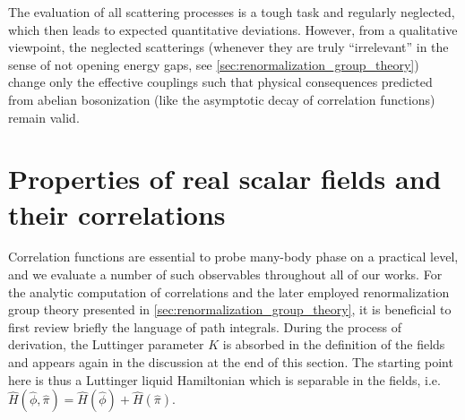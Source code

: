 The evaluation of all scattering processes is a tough task and regularly neglected, which then leads to expected quantitative deviations.
However, from a qualitative viewpoint, the neglected scatterings (whenever they are truly ``irrelevant'' in the sense of not opening energy gaps, see \cref{sec:renormalization_group_theory}) change only the effective couplings such that physical consequences predicted from abelian bosonization (like the asymptotic decay of correlation functions) remain valid.
%
%
\section{Properties of real scalar fields and their correlations}
\label{sec:properties_of_real_scalar_fields_and_their_correlations}
Correlation functions are essential to probe many-body phase on a practical level, and we evaluate a number of such observables throughout all of our works.
For the analytic computation of correlations and the later employed renormalization group theory presented in \cref{sec:renormalization_group_theory}, it is beneficial to first review briefly the language of path integrals.
During the process of derivation, the Luttinger parameter $K$ is absorbed in the definition of the fields and appears again in the discussion at the end of this section.
The starting point here is thus a Luttinger liquid Hamiltonian which is separable in the fields, i.e. $\hat H(\hat\phi,\hat\pi) = \hat H(\hat \phi) + \hat H(\hat \pi)$.

